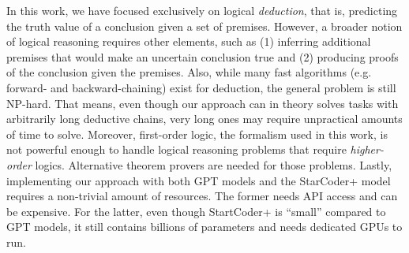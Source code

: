 \documentclass[11pt]{article}
\newcommand{\txo}[1]{\textcolor{blue}{}}
\newcommand{\txo}[1]{\textcolor{blue}{\bf\small [TXO: #1]}}
\newcommand{\TODO}{\textcolor{red}{\textbf{TODO}}}
\begin{document}
In this work, we have focused exclusively on logical \emph{deduction}, that is, predicting the truth value of a conclusion given a set of premises.
However, a broader notion of logical reasoning requires other elements, such as (1) inferring additional premises that would make an uncertain conclusion true and (2) producing proofs of the conclusion given the premises. 
Also, while many fast algorithms (e.g. forward- and backward-chaining) exist for deduction, the general problem is still NP-hard. That means, even though our approach can in theory solves tasks with arbitrarily long deductive chains, very long ones may require unpractical amounts of time to solve. Moreover, first-order logic, the formalism used in this work, is not powerful enough to handle logical reasoning problems that require \textit{higher-order} logics. Alternative theorem provers are needed for those problems. Lastly, implementing our approach with both GPT models and the StarCoder+ model requires a non-trivial amount of resources. The former needs API access and can be expensive. For the latter, even though StartCoder+ is ``small'' compared to GPT models, it still contains billions of parameters and needs dedicated GPUs to run. 








\appendix

\end{document}
